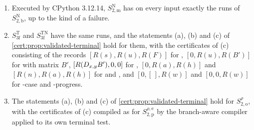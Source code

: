 \begin{proposition}\label{cert:prop:validated-three}
\begin{enumerate}[label=(\alph*)]
\item Executed by CPython 3.12.14, $S^{\mathrm N}_{2,\mathrm m}$ has on every input
exactly the runs of $S^{\mathrm N}_{2,\mathrm b}$, up to the kind of a failure.
\item $S^{\mathrm T}_{3\mathrm f}$ and $S^{\mathrm{TN}}_{3\mathrm f}$ have the same
runs, and the statements (a), (b) and (c) of \cref{cert:prop:validated-terminal}
hold for them, with the certificates of (c) consisting of the records
$[R(s),R(u),R(F)]$ for , $[0,R(u),R(B')]$ for  with matrix
$B'$, $[R(D_{x,y}B'),0,0]$ for , $[0,R(a),R(h)]$ and $[R(n),R(a),R(h)]$
for  and , and $[0,[\,],R(w)]$ and $[0,0,R(w)]$ for
-case and -progress.
\item The statements (a), (b) and (c) of \cref{cert:prop:validated-terminal} hold for
$S^{\rho}_{2,\mathrm o}$, with the certificates of (c) compiled as for
$S^{\rho,\mathrm e}_{2,\mathrm p}$ by the branch-aware compiler applied to its own
terminal test.
\end{enumerate}
\end{proposition}

